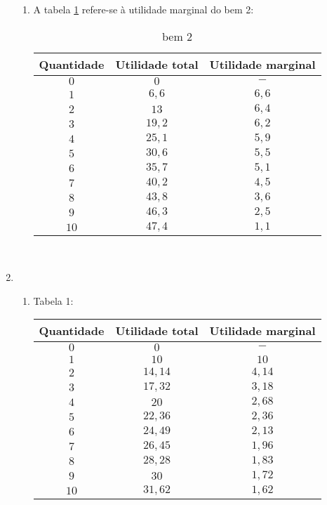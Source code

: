 \documentclass[a4paper, 12pt]{article}
\begin{document}
\begin{enumerate}
\begin{enumerate}
		\item A tabela \ref{tbl56-2} refere-se à utilidade marginal do bem 2:
		\begin{table}[H]
			\centering
			\begin{tabular}{|c|c|c|}
				\hline
				Quantidade & Utilidade total & Utilidade marginal \\ \hline
				$0$ & $0$ & $-$\\ \hline
				$1$ & $6,6$ & $6,6$\\ \hline
				$2$ & $13$ & $6,4$\\ \hline
				$3$ & $19,2$ & $6,2$\\ \hline
				$4$ & $25,1$ & $5,9$\\ \hline
				$5$ & $30,6$ & $5,5$\\ \hline
				$6$ & $35,7$ & $5,1$\\ \hline
				$7$ & $40,2$ & $4,5$\\ \hline
				$8$ & $43,8$ & $3,6$\\ \hline
				$9$ & $46,3$ & $2,5$\\ \hline
				$10$ & $47,4$ & $1,1$\\ \hline
			\end{tabular}
			\caption{bem 2}
			\label{tbl56-2}
		\end{table}
	\end{enumerate}
	\\

	\item
	\begin{enumerate}
		\item Tabela 1:
		\begin{table}[H]
			\centering
			\begin{tabular}{|c|c|c|}
				\hline
				Quantidade & Utilidade total & Utilidade marginal \\ \hline
				$0$ & $0$ & $-$\\ \hline
				$1$ & $10$ & $10$\\ \hline
				$2$ & $14,14$ & $4,14$\\ \hline
				$3$ & $17,32$ & $3,18$\\ \hline
				$4$ & $20$ & $2,68$\\ \hline
				$5$ & $22,36$ & $2,36$\\ \hline
				$6$ & $24,49$ & $2,13$\\ \hline
				$7$ & $26,45$ & $1,96$\\ \hline
				$8$ & $28,28$ & $1,83$\\ \hline
				$9$ & $30$ & $1,72$\\ \hline
				$10$ & $31,62$ & $1,62$\\ \hline
			\end{tabular}
		\end{table}
		

\end{enumerate}
\end{enumerate}
\end{document}
